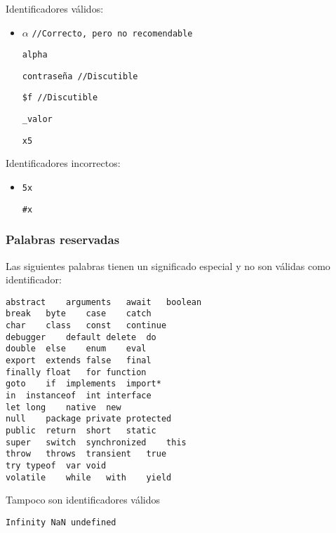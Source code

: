 \documentclass[ucs]{beamer}
\begin{document}
\begin{frame}[fragile]
\frametitle{}

Identificadores válidos:
    \begin{itemize}
    \item

$\alpha$   \verb|//Correcto, pero no recomendable| 

\verb|alpha|

\verb|contraseña //Discutible|

\verb|$f //Discutible|

\verb|_valor|

\verb|x5|
    \end{itemize}


Identificadores incorrectos:

    \begin{itemize}
    \item
\verb|5x|

\verb|#x|

    \end{itemize}




\end{frame}






\begin{frame}[fragile]
\frametitle{Palabras reservadas}
Las siguientes palabras tienen un significado especial y no
son válidas como identificador:

  \begin{scriptsize}
  \begin{verbatim}
abstract    arguments   await   boolean
break   byte    case    catch
char    class   const   continue
debugger    default delete  do
double  else    enum    eval
export  extends false   final
finally float   for function
goto    if  implements  import*
in  instanceof  int interface
let long    native  new
null    package private protected
public  return  short   static
super   switch  synchronized    this
throw   throws  transient   true
try typeof  var void
volatile    while   with    yield
  \end{verbatim}
  \end{scriptsize}
Tampoco son identificadores válidos
  \begin{scriptsize}
  \begin{verbatim}
Infinity NaN undefined
  \end{verbatim}
  \end{scriptsize}

\end{frame}
\end{document}

